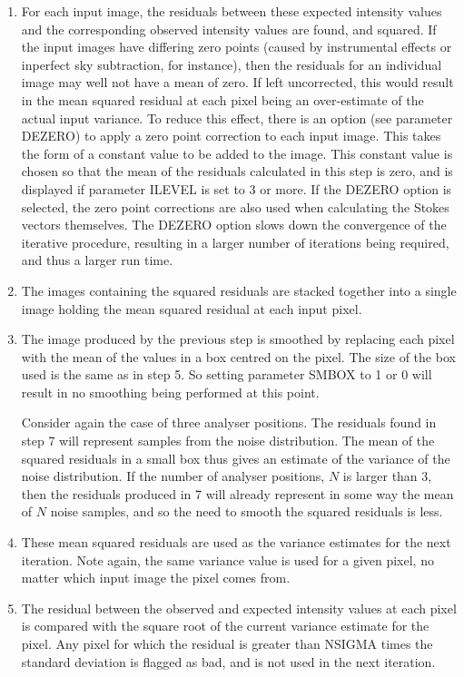 \documentclass[twoside,11pt]{article}
\renewcommand{\_}{\texttt{\symbol{95}}}
\begin{document}
\begin{enumerate}
\item For each input image, the residuals between these expected intensity 
values and the corresponding observed intensity values are found, and
squared. If the input images have differing zero points (caused by
instrumental effects or inperfect sky subtraction, for instance), then
the residuals for an individual image may well not have a mean of zero.
If left uncorrected, this would result in the mean squared residual at
each pixel being an over-estimate of the actual input variance. To reduce
this effect, there is an option (see parameter DEZERO) to apply a zero
point correction to each input image. This takes the form of a constant
value to be added to the image. This constant value is chosen so that the
mean of the residuals calculated in this step is zero, and is displayed
if parameter ILEVEL is set to 3 or more. If the DEZERO option is
selected, the zero point corrections are also used when calculating the
Stokes vectors themselves. The DEZERO option slows down the convergence
of the iterative procedure, resulting in a larger number of iterations
being required, and thus a larger run time. 

\item The images containing the squared residuals are stacked together
into a single image holding the mean squared residual at each input pixel.

\item The image produced by the previous step is smoothed by replacing
each pixel with the mean of the values in a box centred on the pixel.
The size of the box used is the same as in step 5. So setting
parameter SMBOX to 1 or 0 will result in no smoothing being performed
at this point.

Consider again the case of three analyser positions. The residuals found in
step 7 will represent samples from the noise distribution. The
mean of the squared residuals in a small box thus gives an estimate of the 
variance of the noise distribution. If the number of analyser positions,
$N$ is larger than 3, then the residuals produced in 7 will already
represent in some way the mean of $N$ noise samples, and so the need to
smooth the squared residuals is less. 

\item These mean squared residuals are used as the variance estimates
for the next iteration. Note again, the same variance value is used for
a given pixel, no matter which input image the pixel comes from.

\item The residual between the observed and expected intensity values at
each pixel is compared with the square root of the current variance estimate 
for the pixel. Any pixel for which the residual is greater than NSIGMA
times the standard deviation is flagged as bad, and is not used in the
next iteration.


\end{enumerate}
\end{document}
